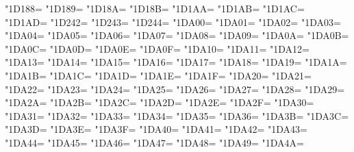 \XeTeXcharclass"1D188=\KclassCM
\XeTeXcharclass"1D189=\KclassCM
\XeTeXcharclass"1D18A=\KclassCM
\XeTeXcharclass"1D18B=\KclassCM
\XeTeXcharclass"1D1AA=\KclassCM
\XeTeXcharclass"1D1AB=\KclassCM
\XeTeXcharclass"1D1AC=\KclassCM
\XeTeXcharclass"1D1AD=\KclassCM
\XeTeXcharclass"1D242=\KclassCM
\XeTeXcharclass"1D243=\KclassCM
\XeTeXcharclass"1D244=\KclassCM
\XeTeXcharclass"1DA00=\KclassCM
\XeTeXcharclass"1DA01=\KclassCM
\XeTeXcharclass"1DA02=\KclassCM
\XeTeXcharclass"1DA03=\KclassCM
\XeTeXcharclass"1DA04=\KclassCM
\XeTeXcharclass"1DA05=\KclassCM
\XeTeXcharclass"1DA06=\KclassCM
\XeTeXcharclass"1DA07=\KclassCM
\XeTeXcharclass"1DA08=\KclassCM
\XeTeXcharclass"1DA09=\KclassCM
\XeTeXcharclass"1DA0A=\KclassCM
\XeTeXcharclass"1DA0B=\KclassCM
\XeTeXcharclass"1DA0C=\KclassCM
\XeTeXcharclass"1DA0D=\KclassCM
\XeTeXcharclass"1DA0E=\KclassCM
\XeTeXcharclass"1DA0F=\KclassCM
\XeTeXcharclass"1DA10=\KclassCM
\XeTeXcharclass"1DA11=\KclassCM
\XeTeXcharclass"1DA12=\KclassCM
\XeTeXcharclass"1DA13=\KclassCM
\XeTeXcharclass"1DA14=\KclassCM
\XeTeXcharclass"1DA15=\KclassCM
\XeTeXcharclass"1DA16=\KclassCM
\XeTeXcharclass"1DA17=\KclassCM
\XeTeXcharclass"1DA18=\KclassCM
\XeTeXcharclass"1DA19=\KclassCM
\XeTeXcharclass"1DA1A=\KclassCM
\XeTeXcharclass"1DA1B=\KclassCM
\XeTeXcharclass"1DA1C=\KclassCM
\XeTeXcharclass"1DA1D=\KclassCM
\XeTeXcharclass"1DA1E=\KclassCM
\XeTeXcharclass"1DA1F=\KclassCM
\XeTeXcharclass"1DA20=\KclassCM
\XeTeXcharclass"1DA21=\KclassCM
\XeTeXcharclass"1DA22=\KclassCM
\XeTeXcharclass"1DA23=\KclassCM
\XeTeXcharclass"1DA24=\KclassCM
\XeTeXcharclass"1DA25=\KclassCM
\XeTeXcharclass"1DA26=\KclassCM
\XeTeXcharclass"1DA27=\KclassCM
\XeTeXcharclass"1DA28=\KclassCM
\XeTeXcharclass"1DA29=\KclassCM
\XeTeXcharclass"1DA2A=\KclassCM
\XeTeXcharclass"1DA2B=\KclassCM
\XeTeXcharclass"1DA2C=\KclassCM
\XeTeXcharclass"1DA2D=\KclassCM
\XeTeXcharclass"1DA2E=\KclassCM
\XeTeXcharclass"1DA2F=\KclassCM
\XeTeXcharclass"1DA30=\KclassCM
\XeTeXcharclass"1DA31=\KclassCM
\XeTeXcharclass"1DA32=\KclassCM
\XeTeXcharclass"1DA33=\KclassCM
\XeTeXcharclass"1DA34=\KclassCM
\XeTeXcharclass"1DA35=\KclassCM
\XeTeXcharclass"1DA36=\KclassCM
\XeTeXcharclass"1DA3B=\KclassCM
\XeTeXcharclass"1DA3C=\KclassCM
\XeTeXcharclass"1DA3D=\KclassCM
\XeTeXcharclass"1DA3E=\KclassCM
\XeTeXcharclass"1DA3F=\KclassCM
\XeTeXcharclass"1DA40=\KclassCM
\XeTeXcharclass"1DA41=\KclassCM
\XeTeXcharclass"1DA42=\KclassCM
\XeTeXcharclass"1DA43=\KclassCM
\XeTeXcharclass"1DA44=\KclassCM
\XeTeXcharclass"1DA45=\KclassCM
\XeTeXcharclass"1DA46=\KclassCM
\XeTeXcharclass"1DA47=\KclassCM
\XeTeXcharclass"1DA48=\KclassCM
\XeTeXcharclass"1DA49=\KclassCM
\XeTeXcharclass"1DA4A=\KclassCM
